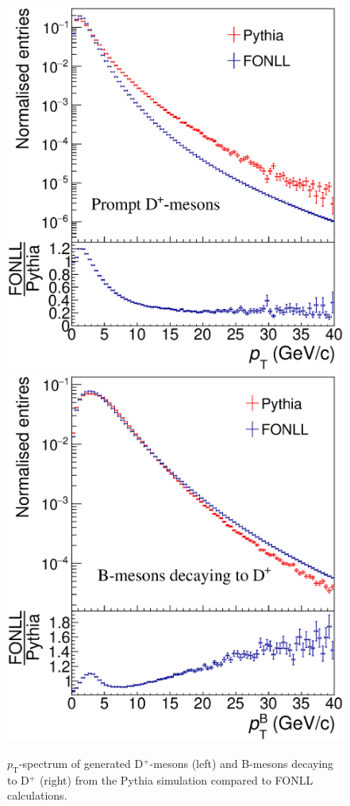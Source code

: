 \documentclass[b5paper,10pt,twoside,oldstyle,classica]{toptesi}
\newcommand{\pt}{p_\text{T}}
\begin{document}
\begin{figure}[tb]
\begin{center}
{\includegraphics[scale = 0.3]{DplusPrompt_PtSpectrum.eps}}
\hspace{0cm}
{\includegraphics[scale = 0.3]{Bmesons_PtSpetrum.eps}}
\caption{$\pt$-spectrum of generated D$^+$-mesons (left) and B-mesons decaying to D$^+$ (right) from the Pythia simulation compared to FONLL calculations.}
\label{ptrew_spectra}
\end{center}
\end{figure}
\end{document}
